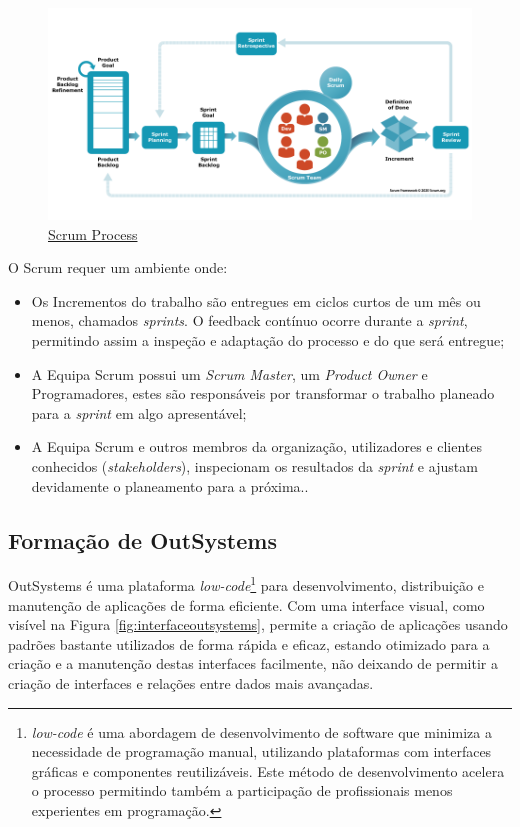       \begin{figure}[H]
          \centering
          \includegraphics[scale=0.50]{imgs/scrum.png}
          \caption{\href{https://www.scrum.org/resources/what-scrum-module}{Scrum Process}}\label{fig:scrum}
      \end{figure}

      O Scrum requer um ambiente onde:
      \begin{itemize}
        \item Os Incrementos do trabalho são entregues em ciclos curtos de um mês ou menos, chamados \textit{sprints}. O feedback contínuo ocorre durante a \textit{sprint}, permitindo assim a inspeção e adaptação do processo e do que será entregue;
        \item A Equipa Scrum possui um \textit{Scrum Master}, um \textit{Product Owner} e Programadores, estes são responsáveis por transformar o trabalho planeado para a \textit{sprint} em algo apresentável;
        \item A Equipa Scrum e outros membros da organização, utilizadores e clientes conhecidos (\textit{stakeholders}), inspecionam os resultados da \textit{sprint} e ajustam devidamente o planeamento para a próxima.\cite{scrum}.
      \end{itemize}
    
    \subsection{Formação de OutSystems}\label{subsec:outsystems}

      OutSystems é uma plataforma \textit{low-code}\footnote{\textit{low-code} é uma abordagem de desenvolvimento de software que minimiza a necessidade de programação manual, utilizando plataformas com interfaces gráficas e componentes reutilizáveis. Este método de desenvolvimento acelera o processo permitindo também a participação de profissionais menos experientes em programação.} para desenvolvimento, distribuição e manutenção de aplicações de forma eficiente. Com uma interface visual, como visível na Figura \ref{fig:interfaceoutsystems}, permite a criação de aplicações usando padrões bastante utilizados de forma rápida e eficaz, estando otimizado para a criação e a manutenção destas interfaces facilmente, não deixando de permitir a criação de interfaces e relações entre dados mais avançadas.

